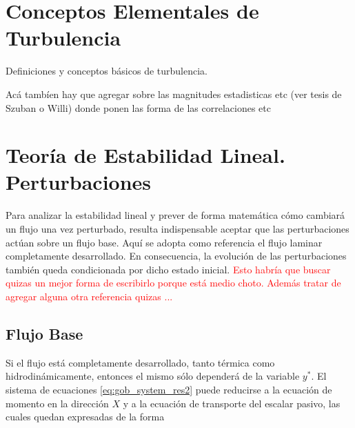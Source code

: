 \newpage

\section{Conceptos Elementales de Turbulencia} \label{sec:turbu}
Definiciones y conceptos básicos de turbulencia.

Acá tambíen hay que agregar sobre las magnitudes estadisticas etc (ver tesis de Szuban o Willi) donde ponen las forma de las correlaciones etc

\newpage
\section{Teoría de Estabilidad Lineal. Perturbaciones} \label{line_an}

Para analizar la estabilidad lineal y prever de forma matemática cómo cambiará un flujo una vez perturbado, resulta indispensable aceptar que las perturbaciones actúan sobre un flujo base. Aquí se adopta como referencia el flujo laminar completamente desarrollado. En consecuencia, la evolución de las perturbaciones también queda condicionada por dicho estado inicial. \textcolor{red}{Esto habría que buscar quizas un mejor forma de escribirlo porque está medio choto. Además tratar de agregar alguna otra referencia quizas ...}



\subsection{Flujo Base}

Si el flujo está completamente desarrollado, tanto térmica como hidrodinámicamente, entonces el mismo sólo dependerá de la variable $y^*$. El sistema de ecuaciones \ref{eq:gob_system_res2} puede reducirse a la ecuación de momento en la dirección $X$ y a la ecuación de transporte del escalar pasivo, las cuales quedan expresadas de la forma 

